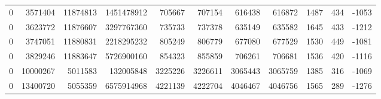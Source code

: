 \begin{tabular}{rrrrrrrrrrr}
0 & 3571404 & 11874813 & 1451478912 & 705667 & 707154 & 616438 & 616872 & 1487 & 434 & -1053 \\
0 & 3623772 & 11876607 & 3297767360 & 735733 & 737378 & 635149 & 635582 & 1645 & 433 & -1212 \\
0 & 3747051 & 11880831 & 2218295232 & 805249 & 806779 & 677080 & 677529 & 1530 & 449 & -1081 \\
0 & 3829246 & 11883647 & 5726900160 & 854323 & 855859 & 706261 & 706681 & 1536 & 420 & -1116 \\
0 & 10000267 & 5011583 & 132005848 & 3225226 & 3226611 & 3065443 & 3065759 & 1385 & 316 & -1069 \\
0 & 13400720 & 5055359 & 6575914968 & 4221139 & 4222704 & 4046467 & 4046756 & 1565 & 289 & -1276 \\
\bottomrule
\end{tabular}
